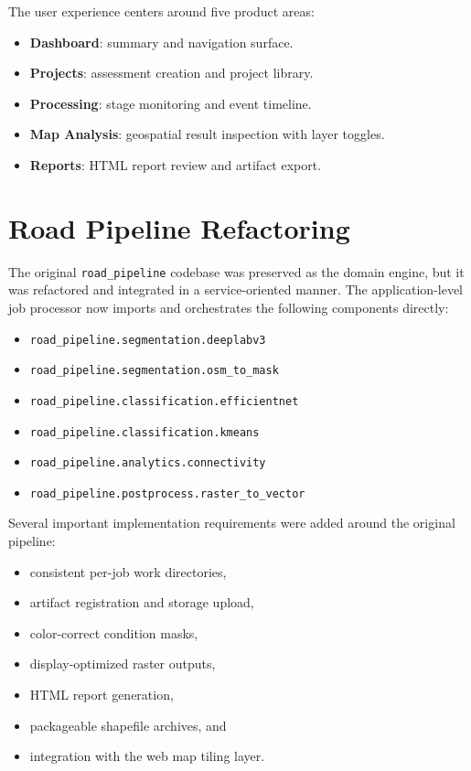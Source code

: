 \documentclass[conference]{IEEEtran}
\begin{document}
The user experience centers around five product areas:

\begin{itemize}[leftmargin=16pt]
\item \textbf{Dashboard}: summary and navigation surface.
\item \textbf{Projects}: assessment creation and project library.
\item \textbf{Processing}: stage monitoring and event timeline.
\item \textbf{Map Analysis}: geospatial result inspection with layer toggles.
\item \textbf{Reports}: HTML report review and artifact export.
\end{itemize}

\section{Road Pipeline Refactoring}
The original \texttt{road\_pipeline} codebase was preserved as the domain engine,
but it was refactored and integrated in a service-oriented manner. The
application-level job processor now imports and orchestrates the following
components directly:

\begin{itemize}[leftmargin=16pt]
\item \texttt{road\_pipeline.segmentation.deeplabv3}
\item \texttt{road\_pipeline.segmentation.osm\_to\_mask}
\item \texttt{road\_pipeline.classification.efficientnet}
\item \texttt{road\_pipeline.classification.kmeans}
\item \texttt{road\_pipeline.analytics.connectivity}
\item \texttt{road\_pipeline.postprocess.raster\_to\_vector}
\end{itemize}

Several important implementation requirements were added around the original
pipeline:

\begin{itemize}[leftmargin=16pt]
\item consistent per-job work directories,
\item artifact registration and storage upload,
\item color-correct condition masks,
\item display-optimized raster outputs,
\item HTML report generation,
\item packageable shapefile archives, and
\item integration with the web map tiling layer.
\end{itemize}
\end{document}
